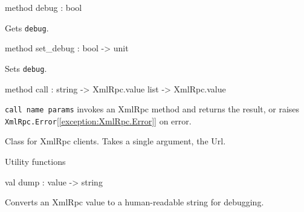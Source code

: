 \documentclass[11pt]{article}
\begin{document}
\begin{ocamldocobjectend}
\begin{ocamldocdescription}
\end{ocamldocdescription}


\label{method:XmlRpc.client.debug}\begin{ocamldoccode}
method debug : bool
\end{ocamldoccode}
\begin{ocamldocdescription}
Gets {\tt{debug}}.


\end{ocamldocdescription}


\label{method:XmlRpc.client.set-underscoredebug}\begin{ocamldoccode}
method set_debug : bool -> unit
\end{ocamldoccode}
\begin{ocamldocdescription}
Sets {\tt{debug}}.


\end{ocamldocdescription}


\label{method:XmlRpc.client.call}\begin{ocamldoccode}
method call : string -> XmlRpc.value list -> XmlRpc.value
\end{ocamldoccode}
\begin{ocamldocdescription}
{\tt{call name params}} invokes an XmlRpc method and returns the result,
      or raises {\tt{XmlRpc.Error}}[\ref{exception:XmlRpc.Error}] on error.


\end{ocamldocdescription}
\end{ocamldocobjectend}


\begin{ocamldocdescription}
Class for XmlRpc clients. Takes a single argument, the Url.


\end{ocamldocdescription}




Utility functions



\label{val:XmlRpc.dump}\begin{ocamldoccode}
val dump : value -> string
\end{ocamldoccode}
\begin{ocamldocdescription}
Converts an XmlRpc value to a human-readable string for debugging.


\end{ocamldocdescription}
\end{document}
